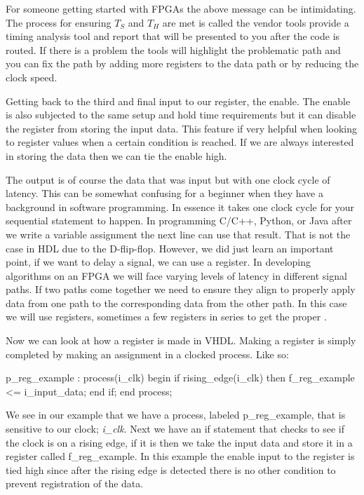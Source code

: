 For someone getting started with \ac{FPGA}s the above message can be intimidating. The process for ensuring $T_S$ and $T_H$ are met is called \emph{} the vendor tools provide a timing analysis tool and report that will be presented to you after the code is routed. If there is a problem the tools will highlight the problematic path and you can fix the path by adding more registers to the data path or by reducing the clock speed. 

Getting back to the third and final input to our register, the enable. The enable is also subjected to the same setup and hold time requirements but it can disable the register from storing the input data. This feature if very helpful when looking to register values when a certain condition is reached. If we are always interested in storing the data then we can tie the enable high.

The output is of course the data that was input but with one clock cycle of latency. This can be somewhat confusing for a beginner when they have a background in software programming. In essence it takes one clock cycle for your sequential statement to happen. In programming C/C++, Python, or Java after we write a variable assignment the next line can use that result. That is not the case in \ac{HDL} due to the D-flip-flop. However, we did just learn an important point, if we want to delay a signal, we can use a register. In developing algorithms on an \ac{FPGA} we will face varying levels of latency in different signal paths. If two paths come together we need to ensure they align to properly apply data from one path to the corresponding data from the other path. In this case we will use registers, sometimes a few registers in series to get the proper . 

Now we can look at how a register is made in \ac{VHDL}. Making a register is simply completed by making an assignment in a clocked process. Like so:

\begin{VHDLlisting}[tabsize=4]
p_reg_example : process(i_clk)
begin
    if rising_edge(i_clk) then
        f_reg_example <= i_input_data;
    end if;
end process;
\end{VHDLlisting}
	
We see in our example that we have a process, labeled p\_reg\_example, that is sensitive to our clock; \emph{i\_clk}. Next we have an if statement that checks to see if the clock is on a rising edge, if it is then we take the input data and store it in a register called f\_reg\_example. In this example the enable input to the register is tied high since after the rising edge is detected there is no other condition to prevent registration of the data.  	
	
